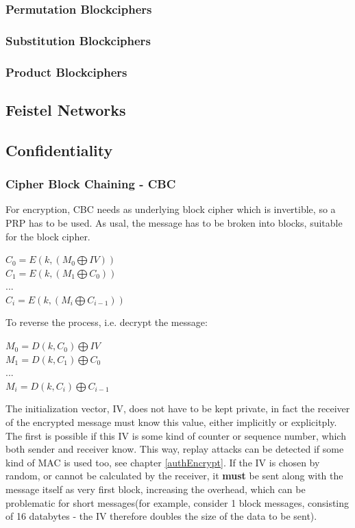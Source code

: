 \subsubsection{Permutation Blockciphers}

\subsubsection{Substitution Blockciphers}

\subsubsection{Product Blockciphers}

\subsection{Feistel Networks}

\subsection{Confidentiality}\label{confidentiality}

\subsubsection{Cipher Block Chaining - CBC}

For encryption, CBC needs as underlying block cipher which is invertible, so a PRP has to be used. 
As usal, the message has to be broken into blocks, suitable for the block cipher. 

\begin{center}
$ C_0 = E(k, (M_0 \bigoplus IV ) )  $
\\
$ C_1 = E(k, (M_1  \bigoplus C_0) ) $
\\
$...$
\\
$ C_i = E(k, (M_i \bigoplus C_{i-1} ) )  $
\end{center}

To reverse the process, i.e. decrypt the message:

\begin{center}
$ M_0 = D(k, C_0) \bigoplus IV $
\\
$ M_1 = D(k, C_1) \bigoplus C_0 $
\\
$...$
\\
$ M_i = D(k, C_i) \bigoplus C_{i-1} $
\end{center}

The initialization vector, IV, does not have to be kept private, in fact the receiver of the encrypted message must know this value,
either implicitly or explicitply. The first is possible if this IV is some kind of counter or sequence number, which both sender
and receiver know. This way, replay attacks can be detected if some kind of MAC is used too, see chapter \ref{authEncrypt}.
If the IV is chosen by random, or cannot be calculated by the receiver, it \textbf{must} be sent along with the message itself as
very first block, increasing the overhead, which can be problematic for short messages(for example, consider 1 block messages, consisting
of 16 databytes - the IV therefore doubles the size of the data to be sent).

